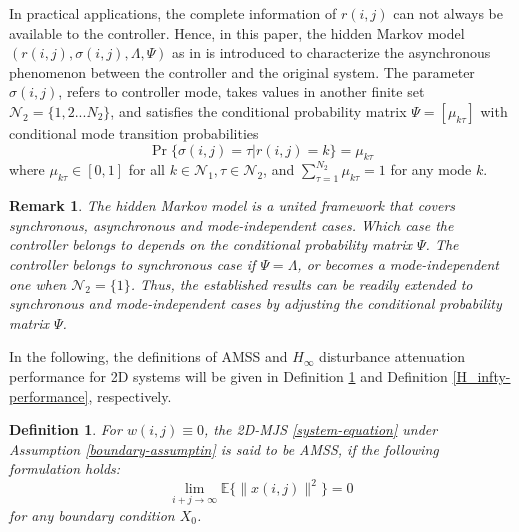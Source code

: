 \documentclass[journal,final,twocolumn]{IEEEtran}
\newtheorem{remark}{Remark}
\newtheorem{definition}{Definition}
\begin{document}
	In practical applications, the complete information of $r(i,j)$ can not always be available to the controller. Hence, in this paper, the hidden Markov model $(r(i,j),\sigma(i,j),\varLambda,\varPsi)$ as in \cite{wu2016passivity} is introduced to characterize the asynchronous phenomenon between the controller and the original system. The parameter $\sigma(i,j)$, refers to controller mode, takes values in another finite set $\mathcal{N}_{2} = \{1,2...N_{2}\}$, and satisfies the conditional probability matrix $\varPsi=[\mu_{k\tau} ]$ with conditional mode transition probabilities
	\begin{equation}
		\Pr\{\sigma(i,j)=\tau|r(i,j)=k\}=\mu_{k\tau } %
	\end{equation}
	where $\mu_{k\tau }\in[0,1]$ for all $k\in\mathcal{N}_{1}, \tau\in\mathcal{N}_{2}$, and $\sum_{\tau =1}^{N_{2}}\mu_{k\tau } = 1$ for any mode $k$.
	
\begin{remark}
	The hidden Markov model is a united framework that covers synchronous, asynchronous and mode-independent cases. Which case the controller belongs to depends on the conditional probability matrix $\varPsi$.  The controller belongs to synchronous case if $\varPsi=\varLambda$, or becomes a mode-independent one when $\mathcal{N}_{2}=\{1\}$. Thus, the established results  can be readily extended to synchronous and mode-independent cases  by adjusting the conditional probability matrix $\varPsi$.
\end{remark}
	
	In the following, the definitions of  AMSS and $H_{\infty}$ disturbance attenuation performance for 2D systems will be given in Definition \ref{mean-square-stable} and Definition \ref{H_infty-performance}, respectively.
	
	\begin{definition}\label{mean-square-stable}
	For $w(i,j)\equiv0$, the 2D-MJS \eqref{system-equation} under Assumption \ref{boundary-assumptin} is said to be AMSS,  if the following formulation holds:
	\begin{equation}\label{AMSS}
			\lim\limits_{i+j\to\infty}\mathbb{E}\{\|x(i,j)\|^{2}\} = 0
	\end{equation}
	for any boundary condition $X_{0}$.
	\end{definition}

\end{document}
